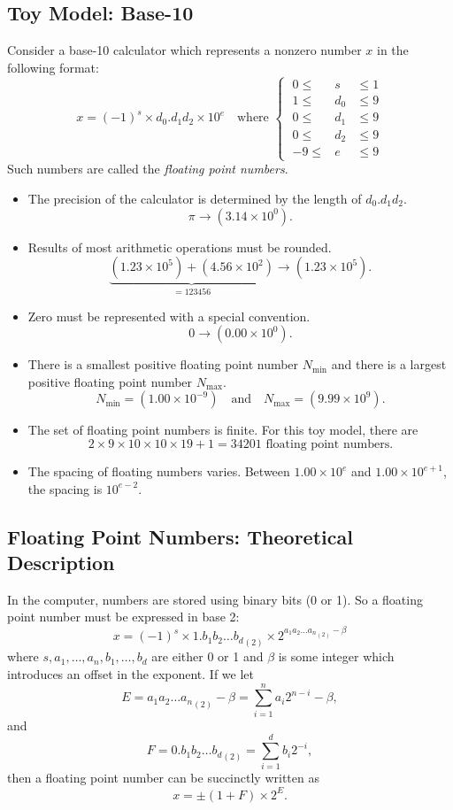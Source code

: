 \documentclass[]{ximera}
\begin{document}
\subsection{Toy Model: Base-10}
Consider a base-10 calculator which represents a nonzero number $x$ in the following format:
\begin{equation*}
x = (-1)^s \times d_0 . d_1 d_2 \times 10^e
\quad\text{where }
\left\{ \;
\begin{array}{rcl}
 0 \le & s   & \le 1 \\
 1 \le & d_0 & \le 9 \\
 0 \le & d_1 & \le 9 \\
 0 \le & d_2 & \le 9 \\
-9 \le & e   & \le 9
\end{array}
\right.
\end{equation*}
Such numbers are called the \emph{floating point numbers}.

\begin{itemize}
\item The precision of the calculator is determined by the length of $d_0 . d_1 d_2$.
\[
   \pi \longrightarrow (3.14 \times 10^0).
   \]
\item Results of most arithmetic operations must be rounded.
\[
   \underbrace{(1.23 \times 10^5) + (4.56 \times 10^2)}_{=123456} \longrightarrow (1.23 \times 10^5).
   \]
\item Zero must be represented with a special convention.
\[
   0 \longrightarrow (0.00 \times 10^0).
   \]
\item There is a smallest positive floating point number $N_{\text{min}}$ and there is a largest positive floating point number $N_{\text{max}}$.
\[
   N_{\text{min}} = (1.00 \times 10^{-9})
   \quad\text{and}\quad
   N_{\text{max}} = (9.99 \times 10^{9}).
   \]
\item The set of floating point numbers is finite. For this toy model, there are
\[
   2 \times 9 \times 10 \times 10 \times 19 + 1 = 34201 \text{ floating point numbers.}
   \]
\item The spacing of floating numbers varies. Between $1.00 \times 10^e$ and $1.00 \times 10^{e+1}$, the spacing is $10^{e-2}$.
\end{itemize}

\subsection{Floating Point Numbers: Theoretical Description}
In the computer, numbers are stored using binary bits (0 or 1). So a floating point number must be expressed in base 2:
\[
x = (-1)^s \times 1.b_1 b_2 \ldots {b_d}_{(2)} \times 2^{a_1 a_2 \ldots {a_n}_{(2)} - \beta}
\]
where $s, a_1, \ldots, a_n, b_1, \ldots, b_d$ are either 0 or 1 and $\beta$ is some integer which introduces an offset in the exponent. If we let
\[
E = a_1 a_2 \ldots {a_n}_{(2)} - \beta = \sum_{i=1}^n a_i 2^{n-i} - \beta, \tag{exponent}
\]
and
\[
F = 0.b_1 b_2 \ldots {b_d}_{(2)} = \sum_{i=1}^{d} b_i 2^{-i}, \tag{mantissa}
\]
then a floating point number can be succinctly written as
\[
x = \pm (1 + F) \times 2^E.
\]
\end{document}
